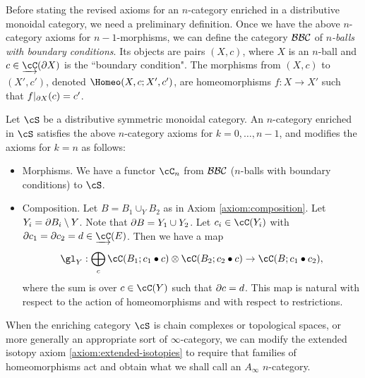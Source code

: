Before stating the revised axioms for an $n$-category enriched in a distributive monoidal category,
we need a preliminary definition.
Once we have the above $n$-category axioms for $n{-}1$-morphisms, we can define the 
category ${\mathcal{BBC}}$ of {\it $n$-balls with boundary conditions}.
Its objects are pairs $(X, c)$, where $X$ is an $n$-ball and $c \in \cl\cC(\bd X)$ is the ``boundary condition".
The morphisms from $(X, c)$ to $(X', c')$, denoted $\Homeo(X,c; X', c')$, are
homeomorphisms $f:X\to X'$ such that $f|_{\partial X}(c) = c'$.
 
\begin{axiom}
\label{axiom:enriched}
Let $\cS$ be a distributive symmetric monoidal category.
An $n$-category enriched in $\cS$ satisfies the above $n$-category axioms for $k=0,\ldots,n-1$,
and modifies the axioms for $k=n$ as follows:
\begin{itemize}
\item Morphisms. We have a functor $\cC_n$ from ${\mathcal{BBC}}$ ($n$-balls with boundary conditions) to $\cS$.
\item Composition. Let $B = B_1\cup_Y B_2$ as in Axiom \ref{axiom:composition}.
Let $Y_i = \partial B_i \setminus Y$.  
Note that $\partial B = Y_1\cup Y_2$.
Let $c_i \in \cC(Y_i)$ with $\bd c_1 = \bd c_2 = d \in \cl\cC(E)$.
Then we have a map
\[
	\gl_Y : \bigoplus_c \cC(B_1; c_1 \bullet c) \otimes \cC(B_2; c_2\bullet c) \to \cC(B; c_1\bullet c_2),
\]
where the sum is over $c\in\cC(Y)$ such that $\partial c = d$.
This map is natural with respect to the action of homeomorphisms and with respect to restrictions.
\end{itemize}
\end{axiom}

\medskip

When the enriching category $\cS$ is chain complexes or topological spaces,
or more generally an appropriate sort of $\infty$-category,
we can modify the extended isotopy axiom \ref{axiom:extended-isotopies}
to require that families of homeomorphisms act
and obtain what we shall call an $A_\infty$ $n$-category.


